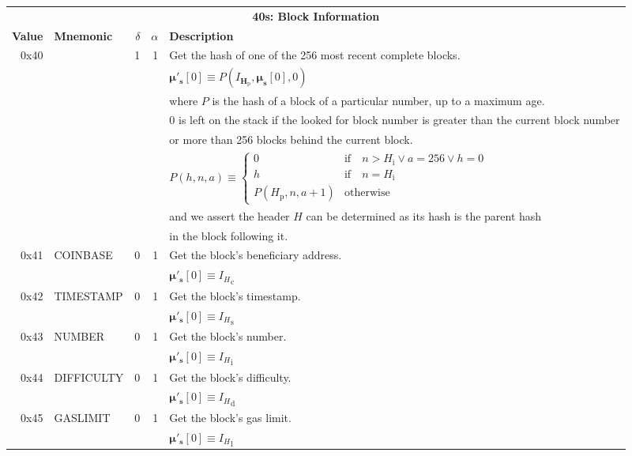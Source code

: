 \documentclass[9pt,oneside]{amsart}
\makeatletter
\newcommand{\linkdest}[1]{\Hy@raisedlink{\hypertarget{#1}{}}}
\makeatother
\begin{document}
\begin{tabular*}{\columnwidth}[h]{rlrrl}
\toprule
\multicolumn{5}{c}{\textbf{40s: Block Information}} \vspace{5pt} \\
\textbf{Value} & \textbf{Mnemonic} & $\delta$ & $\alpha$ & \textbf{Description} \vspace{5pt} \\
0x40 & \linkdest{blockhash}{}{\small BLOCKHASH} & 1 & 1 & Get the hash of one of the 256 most recent complete blocks. \\
&&&& $\boldsymbol{\mu}'_{\mathbf{s}}[0] \equiv P(I_{\mathbf{H}_{\mathrm{p}}}, \boldsymbol{\mu}_{\mathbf{s}}[0], 0)$ \\
&&&& where $P$ is the hash of a block of a particular number, up to a maximum age.\\
&&&& 0 is left on the stack if the looked for block number is greater than the current block number \\
&&&& or more than 256 blocks behind the current block. \\
&&&& $P(h, n, a) \equiv \begin{cases} 0 & \text{if} \quad n > H_{\mathrm{i}} \vee a = 256 \vee h = 0 \\ h & \text{if} \quad n = H_{\mathrm{i}} \\ P(H_{\mathrm{p}}, n, a + 1) & \text{otherwise} \end{cases}$ \\
&&&& and we assert the header $H$ can be determined as its hash is the parent hash \\
&&&& in the block following it. \\
\midrule
0x41 & {\small COINBASE} & 0 & 1 & Get the block's beneficiary address. \\
&&&& $\boldsymbol{\mu}'_{\mathbf{s}}[0] \equiv {I_{H}}_{\mathrm{c}}$ \\
\midrule
0x42 & {\small TIMESTAMP} & 0 & 1 & Get the block's timestamp. \\
&&&& $\boldsymbol{\mu}'_{\mathbf{s}}[0] \equiv {I_{H}}_{\mathrm{s}}$ \\
\midrule
0x43 & {\small NUMBER} & 0 & 1 & Get the block's number. \\
&&&& $\boldsymbol{\mu}'_{\mathbf{s}}[0] \equiv {I_{H}}_{\mathrm{i}}$ \\
\midrule
0x44 & {\small DIFFICULTY} & 0 & 1 & Get the block's difficulty. \\
&&&& $\boldsymbol{\mu}'_{\mathbf{s}}[0] \equiv {I_{H}}_{\mathrm{d}}$ \\
\midrule
0x45 & {\small GASLIMIT} & 0 & 1 & Get the block's gas limit. \\
&&&& $\boldsymbol{\mu}'_{\mathbf{s}}[0] \equiv {I_{H}}_{\mathrm{l}}$ \\
\bottomrule
\end{tabular*}
\end{document}
